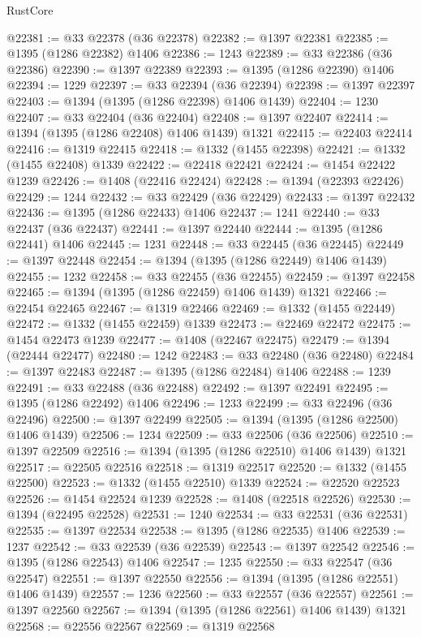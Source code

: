 \begin{lexlean}{RustCore}
\begin{coremodule}
@22381 := @33 @22378 (@36 @22378)
@22382 := @1397 @22381
@22385 := @1395 (@1286 @22382) @1406
@22386 := 1243
@22389 := @33 @22386 (@36 @22386)
@22390 := @1397 @22389
@22393 := @1395 (@1286 @22390) @1406
@22394 := 1229
@22397 := @33 @22394 (@36 @22394)
@22398 := @1397 @22397
@22403 := @1394 (@1395 (@1286 @22398) @1406 @1439)
@22404 := 1230
@22407 := @33 @22404 (@36 @22404)
@22408 := @1397 @22407
@22414 := @1394 (@1395 (@1286 @22408) @1406 @1439) @1321
@22415 := @22403 @22414
@22416 := @1319 @22415
@22418 := @1332 (@1455 @22398)
@22421 := @1332 (@1455 @22408) @1339
@22422 := @22418 @22421
@22424 := @1454 @22422 @1239
@22426 := @1408 (@22416 @22424)
@22428 := @1394 (@22393 @22426)
@22429 := 1244
@22432 := @33 @22429 (@36 @22429)
@22433 := @1397 @22432
@22436 := @1395 (@1286 @22433) @1406
@22437 := 1241
@22440 := @33 @22437 (@36 @22437)
@22441 := @1397 @22440
@22444 := @1395 (@1286 @22441) @1406
@22445 := 1231
@22448 := @33 @22445 (@36 @22445)
@22449 := @1397 @22448
@22454 := @1394 (@1395 (@1286 @22449) @1406 @1439)
@22455 := 1232
@22458 := @33 @22455 (@36 @22455)
@22459 := @1397 @22458
@22465 := @1394 (@1395 (@1286 @22459) @1406 @1439) @1321
@22466 := @22454 @22465
@22467 := @1319 @22466
@22469 := @1332 (@1455 @22449)
@22472 := @1332 (@1455 @22459) @1339
@22473 := @22469 @22472
@22475 := @1454 @22473 @1239
@22477 := @1408 (@22467 @22475)
@22479 := @1394 (@22444 @22477)
@22480 := 1242
@22483 := @33 @22480 (@36 @22480)
@22484 := @1397 @22483
@22487 := @1395 (@1286 @22484) @1406
@22488 := 1239
@22491 := @33 @22488 (@36 @22488)
@22492 := @1397 @22491
@22495 := @1395 (@1286 @22492) @1406
@22496 := 1233
@22499 := @33 @22496 (@36 @22496)
@22500 := @1397 @22499
@22505 := @1394 (@1395 (@1286 @22500) @1406 @1439)
@22506 := 1234
@22509 := @33 @22506 (@36 @22506)
@22510 := @1397 @22509
@22516 := @1394 (@1395 (@1286 @22510) @1406 @1439) @1321
@22517 := @22505 @22516
@22518 := @1319 @22517
@22520 := @1332 (@1455 @22500)
@22523 := @1332 (@1455 @22510) @1339
@22524 := @22520 @22523
@22526 := @1454 @22524 @1239
@22528 := @1408 (@22518 @22526)
@22530 := @1394 (@22495 @22528)
@22531 := 1240
@22534 := @33 @22531 (@36 @22531)
@22535 := @1397 @22534
@22538 := @1395 (@1286 @22535) @1406
@22539 := 1237
@22542 := @33 @22539 (@36 @22539)
@22543 := @1397 @22542
@22546 := @1395 (@1286 @22543) @1406
@22547 := 1235
@22550 := @33 @22547 (@36 @22547)
@22551 := @1397 @22550
@22556 := @1394 (@1395 (@1286 @22551) @1406 @1439)
@22557 := 1236
@22560 := @33 @22557 (@36 @22557)
@22561 := @1397 @22560
@22567 := @1394 (@1395 (@1286 @22561) @1406 @1439) @1321
@22568 := @22556 @22567
@22569 := @1319 @22568

\end{coremodule}
\end{lexlean}
